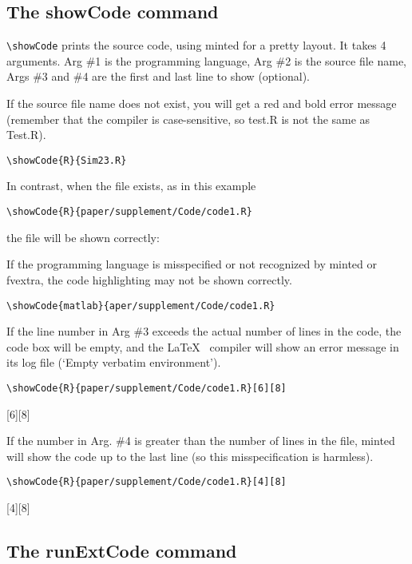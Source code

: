 \documentclass[a4paper,10pt]{article}
\begin{document}
\subsection*{The showCode command}
\verb|\showCode| prints the source code, using minted for a pretty layout. It takes 4 arguments.
Arg \#1 is the programming language,
Arg \#2 is the source file name,
Args \#3 and \#4 are the first and last line to show (optional).
 
If the source file name does not exist, you will get a red and bold error message (remember that the compiler is case-sensitive, so test.R is not the same as Test.R).
\begin{verbatim}\showCode{R}{Sim23.R}
\end{verbatim}

\bigskip
In contrast, when the file exists, as in this example
\begin{verbatim}\showCode{R}{paper/supplement/Code/code1.R}
\end{verbatim}
the file will be shown correctly:


If the programming language is misspecified or not recognized by minted or fvextra, the code highlighting may not be shown correctly.
\begin{verbatim}\showCode{matlab}{aper/supplement/Code/code1.R}
\end{verbatim}

If the line number in Arg \#3 exceeds the actual number of lines in the code, the code box will be empty, and the \LaTeX~ compiler will show an error message in its log file (`Empty verbatim environment').
\begin{verbatim}\showCode{R}{paper/supplement/Code/code1.R}[6][8]
\end{verbatim}
[6][8]

If the number in Arg. \#4 is greater than the number of lines in the file, minted will show the code up to the last line (so this misspecification is harmless).
\begin{verbatim}\showCode{R}{paper/supplement/Code/code1.R}[4][8]
\end{verbatim}
[4][8]

\subsection*{The runExtCode command}
\end{document}
